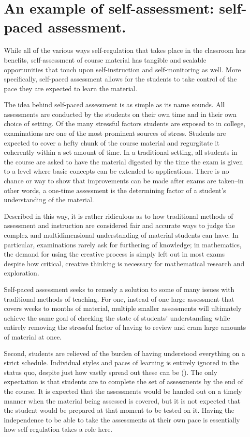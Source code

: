 \section{An example of self-assessment: self-paced assessment.}
While all of the various ways self-regulation that takes place in the classroom has benefits, self-assessment of course material has tangible and scalable opportunities that touch upon self-instruction and self-monitoring as well. More specifically, self-paced assessment allows for the students to take control of the pace they are expected to learn the material.

The idea behind self-paced assessment is as simple as its name sounds. All assessments are conducted by the students on their own time and in their own choice of setting. Of the many stressful factors students are exposed to in college, examinations are one of the most prominent sources of stress. Students are expected to cover a hefty chunk of the course material and regurgitate it coherently within a set amount of time. In a traditional setting, all students in the course are asked to have the material digested by the time the exam is given to a level where basic concepts can be extended to applications. There is no chance or way to show that improvements can be made after exams are taken--in other words, a one-time assessment is the determining factor of a student's understanding of the material.

Described in this way, it is rather ridiculous as to how traditional methods of assessment and instruction are considered fair and accurate ways to judge the complex and multidimensional understanding of material students can have. In particular, examinations rarely ask for furthering of knowledge; in mathematics, the demand for using the creative process is simply left out in most exams despite how critical, creative thinking is necessary for mathematical research and exploration.

Self-paced assessment seeks to remedy a solution to some of many issues with traditional methods of teaching. For one, instead of one large assessment that covers weeks to months of material, multiple smaller assessments will ultimately achieve the same goal of checking the state of students' understanding while entirely removing the stressful factor of having to review and cram large amounts of material at once.

Second, students are relieved of the burden of having understood everything on a strict schedule. Individual styles and paces of learning is entirely ignored in the status quo, despite just how vastly spread out these can be (\cite{busato_intellectual_2000}). The only expectation is that students are to complete the set of assessments by the end of the course. It is expected that the assessments would be handed out on a timely manner when the material being assessed is covered, but it is not expected that the student would be prepared at that moment to be tested on it. Having the independence to be able to take the assessments at their own pace is essentially how self-regulation takes a role here.

